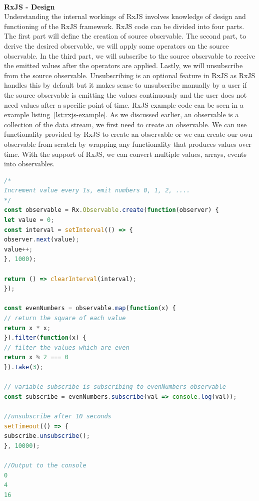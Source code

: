 \leavevmode
\\
\textbf{RxJS - Design}
\\
Understanding the internal workings of RxJS involves knowledge of design and functioning of the RxJS framework. RxJS code can be divided into four parts. The first part will define the creation of source observable. The second part, to derive the desired observable, we will apply some operators on the source observable. In the third part, we will subscribe to the source observable to receive the emitted values after the operators are applied. Lastly, we will unsubscribe from the source observable. Unsubscribing is an optional feature in RxJS as RxJS handles this by default but it makes sense to unsubscribe manually by a user if the source observable is emitting the values continuously and the user does not need values after a specific point of time. RxJS example code can be seen in a example listing~\ref{lst:rxjs-example}. As we discussed earlier, an observable is a collection of the data stream, we first need to create an observable. We can use functionality provided by RxJS to create an observable or we can create our own observable from scratch by wrapping any functionality that produces values over time. With the support of RxJS, we can convert multiple values, arrays, events into observables. 

\begin{lstlisting}[language=JavaScript, caption=RxJS example, label={lst:rxjs-example}]
/*
Increment value every 1s, emit numbers 0, 1, 2, ....
*/
const observable = Rx.Observable.create(function(observer) {
let value = 0;
const interval = setInterval(() => {
observer.next(value);
value++;
}, 1000);

return () => clearInterval(interval);
});

const evenNumbers = observable.map(function(x) {
// return the square of each value
return x * x;
}).filter(function(x) {
// filter the values which are even
return x % 2 === 0
}).take(3);

// variable subscribe is subscribing to evenNumbers observable
const subscribe = evenNumbers.subscribe(val => console.log(val));

//unsubscribe after 10 seconds
setTimeout(() => {
subscribe.unsubscribe();
}, 10000);

//Output to the console
0
4
16
\end{lstlisting}

